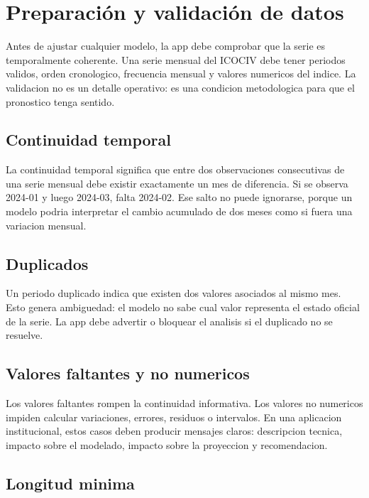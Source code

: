 ﻿\documentclass[12pt,letterpaper]{article}
\newcommand{\ICOCIV}{ICOCIV}
\begin{document}


\section{Preparación y validación de datos}

Antes de ajustar cualquier modelo, la app debe comprobar que la serie es temporalmente coherente. Una serie mensual del \ICOCIV{} debe tener periodos validos, orden cronologico, frecuencia mensual y valores numericos del indice. La validacion no es un detalle operativo: es una condicion metodologica para que el pronostico tenga sentido.

\subsection{Continuidad temporal}

La continuidad temporal significa que entre dos observaciones consecutivas de una serie mensual debe existir exactamente un mes de diferencia. Si se observa 2024-01 y luego 2024-03, falta 2024-02. Ese salto no puede ignorarse, porque un modelo podria interpretar el cambio acumulado de dos meses como si fuera una variacion mensual.

\subsection{Duplicados}

Un periodo duplicado indica que existen dos valores asociados al mismo mes. Esto genera ambiguedad: el modelo no sabe cual valor representa el estado oficial de la serie. La app debe advertir o bloquear el analisis si el duplicado no se resuelve.

\subsection{Valores faltantes y no numericos}

Los valores faltantes rompen la continuidad informativa. Los valores no numericos impiden calcular variaciones, errores, residuos o intervalos. En una aplicacion institucional, estos casos deben producir mensajes claros: descripcion tecnica, impacto sobre el modelado, impacto sobre la proyeccion y recomendacion.

\subsection{Longitud minima}
\end{document}
